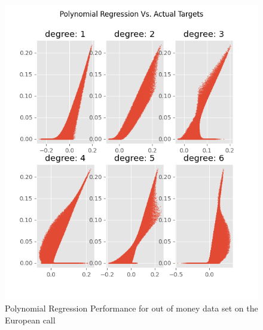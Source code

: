 \begin{figure}[th]
\centering
\includegraphics{Figures/polynomialOutMoneyEuroC.png}
\decoRule
\caption[Polynomial Regression Performance for out-of-money data set European Call]{Polynomial Regression Performance for out of money data set on the European call}
\label{fig:MLPsEuroCOutOfMoney}
\end{figure}

